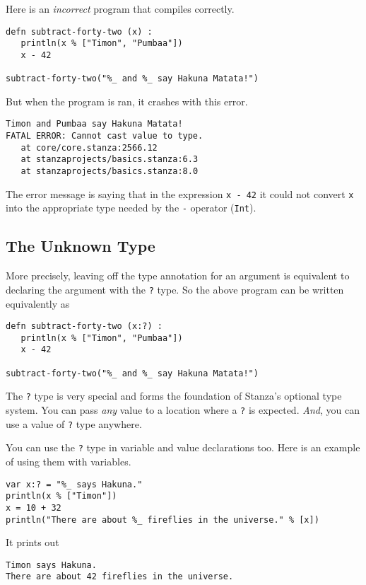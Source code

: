 \documentclass[10pt,oneside]{book}
\begin{document}
Here is an {\em incorrect} program that compiles correctly.
\begin{lstlisting}
defn subtract-forty-two (x) :
   println(x % ["Timon", "Pumbaa"])
   x - 42

subtract-forty-two("%_ and %_ say Hakuna Matata!")
\end{lstlisting}
But when the program is ran, it crashes with this error.
\begin{lstlisting}
Timon and Pumbaa say Hakuna Matata!
FATAL ERROR: Cannot cast value to type.
   at core/core.stanza:2566.12
   at stanzaprojects/basics.stanza:6.3
   at stanzaprojects/basics.stanza:8.0
\end{lstlisting}

The error message is saying that in the expression \texttt{\frenchspacing x - 42} it could not convert \texttt{\frenchspacing x} into the appropriate type needed by the \texttt{\frenchspacing -} operator (\texttt{\frenchspacing Int}). 

\subsection*{The Unknown Type}
More precisely, leaving off the type annotation for an argument is equivalent to declaring the argument with the \texttt{\frenchspacing ?} type. So the above program can be written equivalently as
\begin{lstlisting}
defn subtract-forty-two (x:?) :
   println(x % ["Timon", "Pumbaa"])
   x - 42

subtract-forty-two("%_ and %_ say Hakuna Matata!")
\end{lstlisting}

The \texttt{\frenchspacing ?} type is very special and forms the foundation of Stanza's optional type system. You can pass {\em any} value to a location where a \texttt{\frenchspacing ?} is expected. {\em And}, you can use a value of \texttt{\frenchspacing ?} type anywhere.

You can use the \texttt{\frenchspacing ?} type in variable and value declarations too. Here is an example of using them with variables.
\begin{lstlisting}
var x:? = "%_ says Hakuna."
println(x % ["Timon"])
x = 10 + 32
println("There are about %_ fireflies in the universe." % [x])
\end{lstlisting}
It prints out
\begin{lstlisting}
Timon says Hakuna.
There are about 42 fireflies in the universe.
\end{lstlisting}
\end{document}
